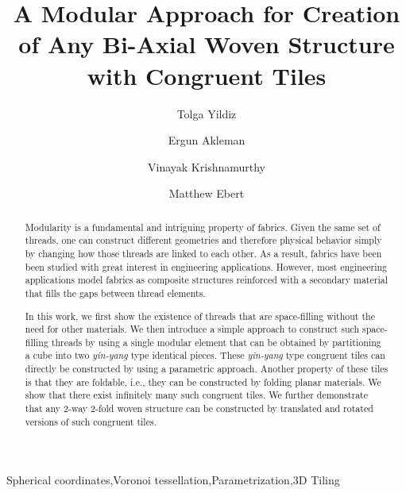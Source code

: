 \documentclass[times,twocolumn,final]{elsarticle}
\begin{document}

\begin{frontmatter}

\title{A Modular Approach for Creation of Any Bi-Axial Woven Structure with Congruent Tiles }%


\author[1]{Tolga Yildiz}
    
\author[1,2]{Ergun  Akleman} 
\author[3]{Vinayak Krishnamurthy}
\author[3]{Matthew Ebert}

\address[1]{Department of Computer Science \& Engineering, Texas A\&M University, College Station, Texas, 77843}
\address[2]{School of Performance, Visualization and Fine Arts, Texas A\&M University, College Station, Texas, 77843}
\address[3]{J. Mike Walker '66 Department of Mechanical Engineering, Texas A\&M University, College Station, Texas, 77843}




\begin{abstract}
Modularity is a fundamental and intriguing property of fabrics. Given the same set of threads, one can construct different geometries and therefore physical behavior simply by changing how those threads are linked to each other. As a result, fabrics have been been studied with great interest in engineering applications. However, most engineering applications model fabrics as composite structures reinforced with a secondary material that fills the gaps between thread elements. 

In this work, we first show the existence of threads that are space-filling without the need for other materials. We then introduce a simple approach to construct such space-filling threads by using a single modular element that can be obtained by partitioning a cube into two \textit{yin-yang} type identical pieces. These \textit{yin-yang} type congruent tiles can directly be constructed by using a parametric approach. Another property of these tiles is that they are foldable, i.e., they can be constructed by folding planar materials. We show that there exist infinitely many such congruent tiles. We further demonstrate that any 2-way 2-fold woven structure can be constructed by translated and rotated versions of such congruent tiles. 

\end{abstract}

\begin{keyword}
\KWD Spherical coordinates\sep Voronoi tessellation\sep Parametrization\sep 3D Tiling
\end{keyword}

\end{frontmatter}
\end{document}
